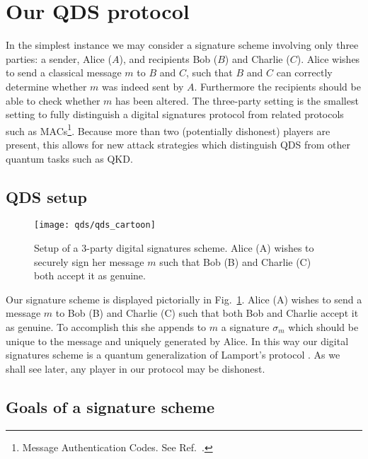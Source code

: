 \section{Our QDS protocol}\label{sec:qds_protocol}

In the simplest instance we may consider a signature scheme involving only three parties: a sender, Alice ($A$), and recipients Bob ($B$) and Charlie ($C$). Alice wishes to send a classical message $m$ to $B$ and $C$, such that $B$ and $C$ can correctly determine whether $m$ was indeed sent by $A$. Furthermore the recipients should be able to check whether $m$ has been altered. The three-party setting is the smallest setting to fully distinguish a digital signatures protocol from related protocols such as MACs\footnote{Message Authentication Codes. See Ref.~\cite{Schneier1996}.}. Because more than two (potentially dishonest) players are present, this allows for new attack strategies which distinguish QDS from other quantum tasks such as QKD.

\subsection{QDS setup}

\begin{figure}[htp]
\centering
\texttt{[image: qds/qds\_cartoon]}
\caption{\label{fig:qds_cartoon} Setup of a $3$-party digital signatures scheme. Alice (A) wishes to securely sign her message $m$ such that Bob (B) and Charlie (C) both accept it as genuine.}
\end{figure}

Our signature scheme is displayed pictorially in Fig.~\ref{fig:qds_cartoon}. Alice (A) wishes to send a message $m$ to Bob (B) and Charlie (C) such that both Bob and Charlie accept it as genuine. To accomplish this she appends to $m$ a signature $\sigma_m$ which should be unique to the message and uniquely generated by Alice. In this way our digital signatures scheme is a quantum generalization of Lamport's protocol \cite{Lamport1979, Schneier1996}. As we shall see later, any player in our protocol may be dishonest.

\subsection{Goals of a signature scheme}\label{sec:qds_goals}




